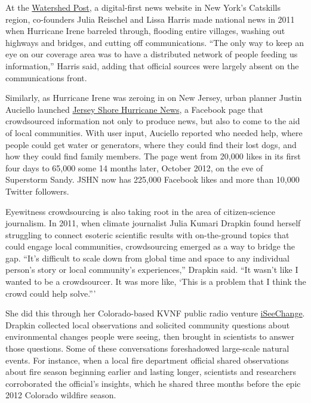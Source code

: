 \documentclass[notoc, symmetric, nobib, nols]{towcenter-guideto-book}
\begin{document}
At the \href{http://www.watershedpost.com/}{Watershed Post}, a digital-first news website in New York's Catskills region, co-founders Julia Reischel and Lissa Harris made national news in 2011 when Hurricane Irene barreled through, flooding entire villages, washing out highways and bridges, and cutting off communications. ``The only way to keep an eye on our coverage area was to have a distributed network of people feeding us information,'' Harris said, adding that official sources were largely absent on the communications front.%

Similarly, as Hurricane Irene was zeroing in on New Jersey, urban planner Justin Auciello launched \href{https://www.facebook.com/JerseyShoreHurricaneNews}{Jersey Shore Hurricane News}, a Facebook page that crowdsourced information not only to produce news, but also to come to the aid of local communities.%
With user input, Auciello reported who needed help, where people could get water or generators, where they could find their lost dogs, and how they could find family members. The page went from 20,000 likes in its first four days to 65,000 some 14 months later, October 2012, on the eve of Superstorm Sandy. JSHN now has 225,000 Facebook likes and more than 10,000 Twitter followers.%

Eyewitness crowdsourcing is also taking root in the area of citizen-science journalism. In 2011, when climate journalist Julia Kumari Drapkin found herself struggling to connect esoteric scientific results with on-the-ground topics that could engage local communities, crowdsourcing emerged as a way to bridge the gap. ``It's difficult to scale down from global time and space to any individual person's story or local community's experiences,'' Drapkin said. ``It wasn't like I wanted to be a crowdsourcer. It was more like, ‘This is a problem that I think the crowd could help solve.'''%

She did this through her Colorado-based KVNF public radio venture \href{https://www.iseechange.org/}{iSeeChange}.\autocite{iSeeChange} Drapkin collected local observations and solicited community questions about environmental changes people were seeing, then brought in scientists to answer those questions. Some of these conversations foreshadowed large-scale natural events. For instance, when a local fire department official shared observations about fire season beginning earlier and lasting longer, scientists and researchers corroborated the official's insights, which he shared three months before the epic 2012 Colorado wildfire season.
\end{document}
